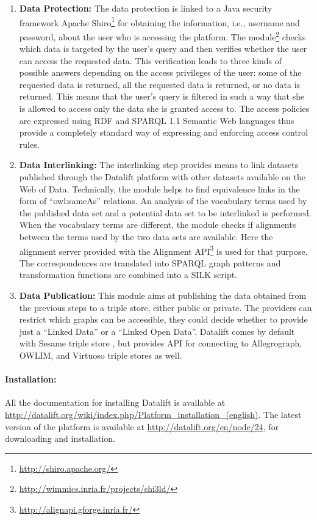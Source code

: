 \begin{enumerate}
\item {\textbf{Data Protection:}}
The data protection is linked to a Java security framework Apache Shiro\footnote{\url{http://shiro.apache.org/}} for obtaining the information, i.e., username and password, about the user who is accessing the platform. The module\footnote{\url{http://wimmics.inria.fr/projects/shi3ld/}} checks which data is targeted by the user's query and then verifies whether the user can access the requested data. This verification leads to three kinds of possible answers depending on the access privileges of the user: some of the requested data is returned, all the requested data is returned, or no data is returned. This means that the user's query is filtered in such a way that she is allowed to access only the data she is granted access to. The access policies are expressed using RDF and SPARQL 1.1 \cite{sparql11} Semantic Web languages thus provide a completely standard way of expressing and enforcing access control rules.

\item{\textbf{Data Interlinking:}}
The interlinking step provides means to link datasets published through the Datalift platform with other datasets available on the Web of Data. Technically, the module helps to find equivalence links in the form of ``owl:sameAs'' relations. An analysis of the vocabulary terms used by the published data set and a potential data set to be interlinked is performed. When the vocabulary terms are different, the module checks if alignments between the terms used by the two data sets are available. Here the alignment server provided with the Alignment API\footnote{\url{http://alignapi.gforge.inria.fr/}} is used for that purpose. The correspondences are translated into SPARQL graph patterns and transformation functions are combined into a SILK script.

\item{\textbf{Data Publication:}}
This module aims at publishing the data obtained from the previous steps to a triple store, either public or private. The providers can restrict which graphs can be accessible, they could decide whether to provide just a ``Linked Data'' or a ``Linked Open Data''. Datalift comes by default with Sesame triple store , but provides API for connecting to Allegrograph, OWLIM, and Virtuoso triple stores as well.
\end{enumerate}

\paragraph{Installation:}
All the documentation for installing Datalift is available at \\\url{http://datalift.org/wiki/index.php/Platform_installation_(english)}. The latest version of the platform is available at \url{http://datalift.org/en/node/24}, for downloading and installation.

